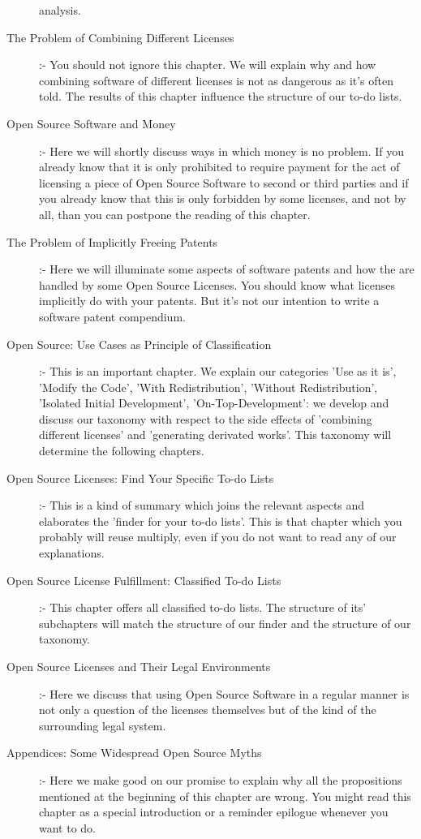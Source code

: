 \begin{description}
  analysis.
  \item[The Problem of Combining Different Licenses] :- You should
  not ignore this chapter. We will explain why and how combining software
  of different licenses is not as dangerous as it's often told. The results of
  this chapter influence the structure of our to-do lists.
  \item[Open Source Software and Money] :- Here we will shortly
  discuss ways in which money is no problem. If you already know that it is only
  prohibited to require payment for the act of licensing a piece of Open Source
  Software to second or third parties and if you already know that this is only
  forbidden by some licenses, and not by all, than you can postpone the reading
  of this chapter.
  \item[The Problem of Implicitly Freeing Patents] :- Here we
  will illuminate some aspects of software patents and how the are handled by
  some Open Source Licenses. You should know what licenses implicitly do with
  your patents. But it's not our intention to write a software patent
  compendium.
  \item[Open Source: Use Cases as Principle of Classification] :- This is an
  important chapter. We explain our categories 'Use as it is', 'Modify the
  Code', 'With Redistribution', 'Without Redistribution', 'Isolated Initial
  Development', 'On-Top-Development': we develop and discuss our taxonomy with
  respect to the side effects of 'combining different licenses' and 'generating
  derivated works'. This taxonomy will determine the following chapters.
  \item[Open Source Licenses: Find Your Specific To-do Lists] :- This is a kind
  of summary which joins the relevant aspects and elaborates the 'finder
  for your to-do lists'. This is that chapter which you probably will reuse
  multiply, even if you do not want to read any of our explanations.
  \item[Open Source License Fulfillment: Classified To-do Lists] :- This chapter
  offers all classified to-do lists. The structure of its' subchapters will
  match the structure of our finder and the structure of our taxonomy.
  \item[Open Source Licenses and Their Legal Environments] :- Here we discuss
  that using Open Source Software in a regular manner is not only a question of
  the licenses themselves but of the kind of the surrounding legal system.
  \item[Appendices: Some Widespread Open Source Myths] :- Here we make good on
  our promise to explain why all the propositions mentioned at the beginning of
  this chapter are wrong. You might read this chapter as a special introduction
  or a reminder epilogue whenever you want to do.
\end{description}


%
